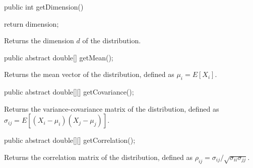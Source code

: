\begin{code}

   public int getDimension()\begin{hide} {
      return dimension;
   }\end{hide}
\end{code}
\begin{tabb}
   Returns the dimension $d$ of the distribution.
\end{tabb}
\begin{code}

   public abstract double[] getMean();
\end{code}
\begin{tabb}
   Returns the mean vector of the distribution, defined as $\mu_{i} = E[X_i]$.
\end{tabb}
\begin{code}

   public abstract double[][] getCovariance();
\end{code}
\begin{tabb}
   Returns the variance-covariance matrix of the distribution, defined as\\
   $\sigma_{ij} = E[(X_i - \mu_i)(X_j - \mu_j)]$.
\end{tabb}
\begin{code}

   public abstract double[][] getCorrelation();
\end{code}
\begin{tabb}
   Returns the correlation matrix of the distribution, defined as
      $\rho_{ij} = \sigma_{ij}/\sqrt{\sigma_{ii}\sigma_{jj}}$.
\end{tabb}
\begin{code}\begin{hide}
}\end{hide}
\end{code}
